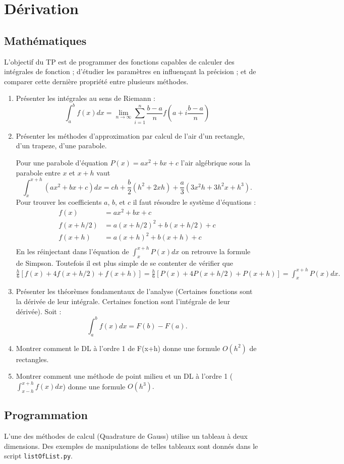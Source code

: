 \section{Dérivation}


\subsection{Mathématiques}
L'objectif du TP est de programmer des fonctions capables de calculer des intégrales de fonction ; d'étudier les paramètres en influençant la précision ; et de comparer cette dernière propriété entre plusieurs méthodes. 

\begin{enumerate}
\item Présenter les intégrales au sens de Riemann : 
$$\int_a^b f(x) dx = \lim_{n\rightarrow\infty} \sum_{i=1}^n \frac{b-a}{n}
f\left( a+i\frac{b-a}{n}\right) $$
\item Présenter les méthodes d'approximation par calcul de l'air d'un rectangle, d'un trapeze, d'une parabole. 

Pour une parabole d'équation $P(x)=ax^2+bx+c$ l'air algébrique sous la parabole entre $x$ et $x+h$ vaut $$\int_x^{x+h} (ax^2+bx+c)dx = ch+\frac{b}{2}(h^2+2xh)+\frac{a}{3}(3x^2h+3h^2x+h^3).$$
Pour trouver les coefficients $a$, $b$, et $c$ il faut résoudre le système d'équations : 
\begin{align}
f(x) &= a x^2 + b x + c \\
f(x+h/2) &= a (x+h/2)^2 + b (x+h/2) + c \\
f(x+h) &= a (x+h)^2 + b (x+h) + c \\
\end{align}
En les réinjectant dans l'équation de $\int_x^{x+h} P(x) dx$ on retrouve la formule de Simpson.
Toutefois il est plus simple de se contenter de vérifier que $\frac{h}{6}\left[f(x) + 4f(x+h/2) + f(x+h)\right] =\frac{h}{6}\left[P(x) + 4P(x+h/2) + P(x+h)\right] = \int_x^{x+h} P(x) dx.$ 
\item Présenter les théorèmes fondamentaux de l'analyse (Certaines fonctions sont la dérivée de leur intégrale. Certaines fonction sont l'intégrale de leur dérivée). Soit :
$$ \int_a^b f(x) dx = F(b) -F(a).$$
\item Montrer comment le DL à l'ordre 1 de F(x+h) donne une formule $O(h^2)$ de rectangles.
\item Montrer comment une méthode de point milieu et un DL à l'ordre 1 ($\int_{x-h}^{x+h}f(x)dx$) donne une formule $O(h^3).$  
\end{enumerate}

\subsection{Programmation}
L'une des méthodes de calcul (Quadrature de Gauss) utilise un tableau à deux dimensions. Des exemples de manipulations de telles tableaux sont donnés dans le script {\tt listOfList.py}.

